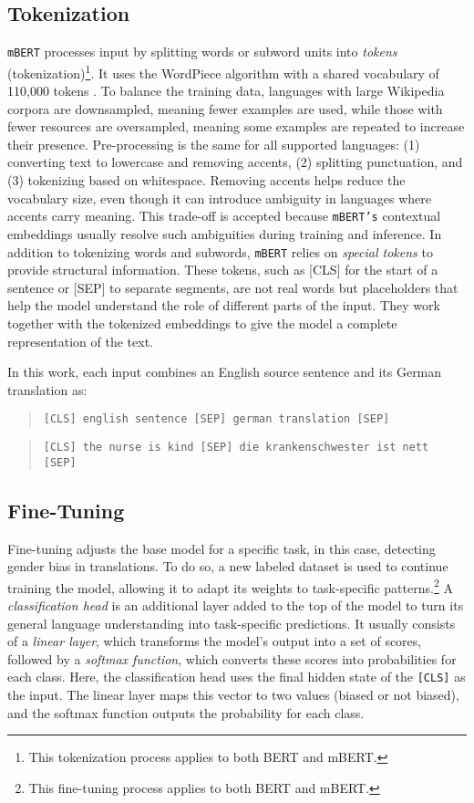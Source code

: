 \subsection{Tokenization}
\texttt{mBERT} processes input by splitting words or subword units into \textit{tokens} (tokenization)\footnote{This tokenization process applies to both BERT and mBERT.}. It uses the WordPiece algorithm with a shared vocabulary of 110,000 tokens \parencite{devlinMultilingualBERTGitHub2018}. To balance the training data, languages with large Wikipedia corpora are downsampled, meaning fewer examples are used, while those with fewer resources are oversampled, meaning some examples are repeated to increase their presence. Pre-processing is the same for all supported languages: (1) converting text to lowercase and removing accents, (2) splitting punctuation, and (3) tokenizing based on whitespace. Removing accents helps reduce the vocabulary size, even though it can introduce ambiguity in languages where accents carry meaning. This trade-off is accepted because \texttt{mBERT's} contextual embeddings usually resolve such ambiguities during training and inference. In addition to tokenizing words and subwords, \texttt{mBERT} relies on \textit{special tokens} to provide structural information. These tokens, such as [CLS] for the start of a sentence or [SEP] to separate segments, are not real words but placeholders that help the model understand the role of different parts of the input. They work together with the tokenized embeddings to give the model a complete representation of the text.

\noindent In this work, each input combines an English source sentence and its German translation as:

\begin{quote}
    \texttt{[CLS] english sentence [SEP] german translation [SEP]}
\end{quote}

\begin{quote}
\texttt{[CLS] the nurse is kind [SEP] die krankenschwester ist nett [SEP]}
\end{quote}

\subsection{Fine-Tuning}
    Fine-tuning adjusts the base model for a specific task, in this case, detecting gender bias in translations. To do so, a new labeled dataset is used to continue training the model, allowing it to adapt its weights to task-specific patterns.\footnote{This fine-tuning process applies to both BERT and mBERT.} A \textit{classification head} is an additional layer added to the top of the model to turn its general language understanding into task-specific predictions. It usually consists of a \textit{linear layer}, which transforms the model’s output into a set of scores, followed by a \textit{softmax function}, which converts these scores into probabilities for each class. Here, the classification head uses the final hidden state of the \texttt{[CLS]} as the input. The linear layer maps this vector to two values (biased or not biased), and the softmax function outputs the probability for each class.

